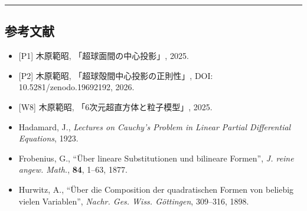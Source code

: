 \documentclass[
  a4paper,11pt]{ltjsarticle}
\providecommand{\tightlist}{%
  \setlength{\itemsep}{0pt}\setlength{\parskip}{0pt}}
\theoremstyle{definition}
\theoremstyle{remark}
\begin{document}
\begin{center}\rule{0.5\linewidth}{0.5pt}\end{center}

\subsection{参考文献}\label{ux53c2ux8003ux6587ux732e}

\begin{itemize}
\tightlist
\item
  {[}P1{]} 木原範昭, 「超球面間の中心投影」, 2025.
\item
  {[}P2{]} 木原範昭, 「超球殻間中心投影の正則性」, DOI:
  10.5281/zenodo.19692192, 2026.
\item
  {[}W8{]} 木原範昭, 「6次元超直方体と粒子模型」, 2025.
\item
  Hadamard, J., \emph{Lectures on Cauchy's Problem in Linear Partial
  Differential Equations}, 1923.
\item
  Frobenius, G., ``Über lineare Substitutionen und bilineare Formen'',
  \emph{J. reine angew. Math.}, \textbf{84}, 1--63, 1877.
\item
  Hurwitz, A., ``Über die Composition der quadratischen Formen von
  beliebig vielen Variablen'', \emph{Nachr. Ges. Wiss. Göttingen},
  309--316, 1898.
\end{itemize}
\end{document}
